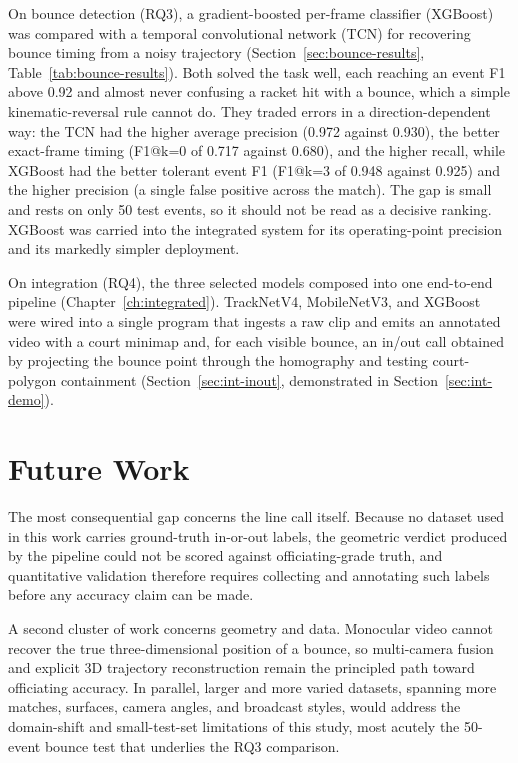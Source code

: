 On bounce detection (RQ3), a gradient-boosted per-frame classifier (XGBoost) was compared with a temporal convolutional network (TCN) for recovering bounce timing from a noisy trajectory (Section~\ref{sec:bounce-results}, Table~\ref{tab:bounce-results}). Both solved the task well, each reaching an event F1 above 0.92 and almost never confusing a racket hit with a bounce, which a simple kinematic-reversal rule cannot do. They traded errors in a direction-dependent way: the TCN had the higher average precision (0.972 against 0.930), the better exact-frame timing (F1@k=0 of 0.717 against 0.680), and the higher recall, while XGBoost had the better tolerant event F1 (F1@k=3 of 0.948 against 0.925) and the higher precision (a single false positive across the match). The gap is small and rests on only 50 test events, so it should not be read as a decisive ranking. XGBoost was carried into the integrated system for its operating-point precision and its markedly simpler deployment.

On integration (RQ4), the three selected models composed into one end-to-end pipeline (Chapter~\ref{ch:integrated}). TrackNetV4, MobileNetV3, and XGBoost were wired into a single program that ingests a raw clip and emits an annotated video with a court minimap and, for each visible bounce, an in/out call obtained by projecting the bounce point through the homography and testing court-polygon containment (Section~\ref{sec:int-inout}, demonstrated in Section~\ref{sec:int-demo}).

\section{Future Work}
\label{sec:concl-future}

The most consequential gap concerns the line call itself. Because no dataset used in this work carries ground-truth in-or-out labels, the geometric verdict produced by the pipeline could not be scored against officiating-grade truth, and quantitative validation therefore requires collecting and annotating such labels before any accuracy claim can be made.

A second cluster of work concerns geometry and data. Monocular video cannot recover the true three-dimensional position of a bounce, so multi-camera fusion and explicit 3D trajectory reconstruction remain the principled path toward officiating accuracy. In parallel, larger and more varied datasets, spanning more matches, surfaces, camera angles, and broadcast styles, would address the domain-shift and small-test-set limitations of this study, most acutely the 50-event bounce test that underlies the RQ3 comparison. 

